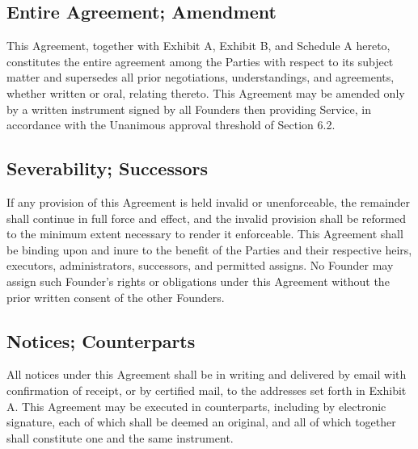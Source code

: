 \subsection{Entire Agreement; Amendment} This Agreement, together with Exhibit A, Exhibit B, and Schedule A hereto, constitutes the entire agreement among the Parties with respect to its subject matter and supersedes all prior negotiations, understandings, and agreements, whether written or oral, relating thereto. This Agreement may be amended only by a written instrument signed by all Founders then providing Service, in accordance with the Unanimous approval threshold of Section 6.2.

\subsection{Severability; Successors} If any provision of this Agreement is held invalid or unenforceable, the remainder shall continue in full force and effect, and the invalid provision shall be reformed to the minimum extent necessary to render it enforceable. This Agreement shall be binding upon and inure to the benefit of the Parties and their respective heirs, executors, administrators, successors, and permitted assigns. No Founder may assign such Founder's rights or obligations under this Agreement without the prior written consent of the other Founders.

\subsection{Notices; Counterparts} All notices under this Agreement shall be in writing and delivered by email with confirmation of receipt, or by certified mail, to the addresses set forth in Exhibit A. This Agreement may be executed in counterparts, including by electronic signature, each of which shall be deemed an original, and all of which together shall constitute one and the same instrument.

